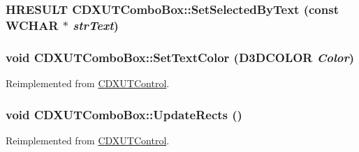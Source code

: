 \hypertarget{class_c_d_x_u_t_combo_box_a6efbd6c0b3cbd66389ad21e25e5fbb14}{
\subsubsection[{SetSelectedByText}]{\setlength{\rightskip}{0pt plus 5cm}HRESULT CDXUTComboBox::SetSelectedByText (const WCHAR $\ast$ {\em strText})}}
\label{class_c_d_x_u_t_combo_box_a6efbd6c0b3cbd66389ad21e25e5fbb14}
\hypertarget{class_c_d_x_u_t_combo_box_ab023a8c2522432d14096f70fb902a0d4}{
\subsubsection[{SetTextColor}]{\setlength{\rightskip}{0pt plus 5cm}void CDXUTComboBox::SetTextColor (D3DCOLOR {\em Color})}}
\label{class_c_d_x_u_t_combo_box_ab023a8c2522432d14096f70fb902a0d4}


Reimplemented from \hyperlink{class_c_d_x_u_t_control_a9132bb5d6b1d2bff1f20df33fec8c98b}{CDXUTControl}.\hypertarget{class_c_d_x_u_t_combo_box_a2170bab00045ce0e43f2381d2c5f3648}{
\subsubsection[{UpdateRects}]{\setlength{\rightskip}{0pt plus 5cm}void CDXUTComboBox::UpdateRects ()}}
\label{class_c_d_x_u_t_combo_box_a2170bab00045ce0e43f2381d2c5f3648}


Reimplemented from \hyperlink{class_c_d_x_u_t_control_a5fb3a79178c678abaa0da57566a09002}{CDXUTControl}.

